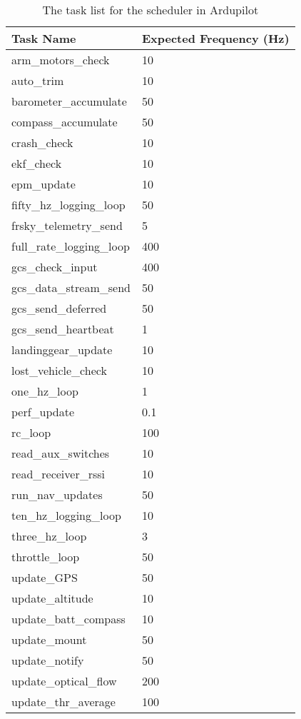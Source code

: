 \begin{table} [h]
  \begin{tabular}{l l}
    \textbf{Task Name} & \textbf{Expected Frequency (Hz)} \\
    \hline 
    arm\_motors\_check & 10 \\
    auto\_trim & 10 \\
    barometer\_accumulate & 50 \\ 
    compass\_accumulate & 50 \\
    crash\_check & 10 \\
    ekf\_check & 10 \\
    epm\_update & 10 \\
    fifty\_hz\_logging\_loop & 50 \\
    frsky\_telemetry\_send & 5 \\
    full\_rate\_logging\_loop & 400 \\
    gcs\_check\_input & 400 \\
    gcs\_data\_stream\_send & 50 \\
    gcs\_send\_deferred & 50 \\
    gcs\_send\_heartbeat & 1  \\
    landinggear\_update & 10 \\
    lost\_vehicle\_check & 10 \\
    one\_hz\_loop & 1 \\
    perf\_update & 0.1  \\
    rc\_loop & 100 \\ 
    read\_aux\_switches & 10  \\
    read\_receiver\_rssi & 10\\
    run\_nav\_updates & 50 \\
    ten\_hz\_logging\_loop & 10 \\
    three\_hz\_loop & 3  \\
    throttle\_loop & 50 \\
    update\_GPS & 50 \\ 
    update\_altitude & 10 \\
    update\_batt\_compass & 10 \\
    update\_mount & 50 \\
    update\_notify & 50 \\
    update\_optical\_flow & 200 \\
    update\_thr\_average & 100\\ 
  \end{tabular}
  \label{table_tasklist}
  \caption{The task list for the scheduler in Ardupilot}
\end{table}
    
